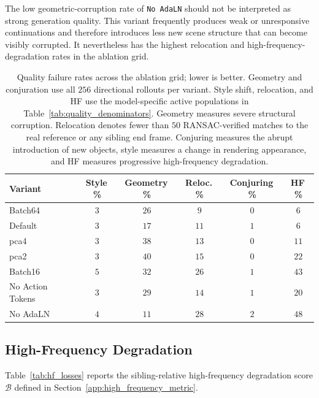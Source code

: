 The low geometric-corruption rate of \texttt{No AdaLN} should not be
interpreted as strong generation quality. This variant frequently produces
weak or unresponsive continuations and therefore introduces less new scene
structure that can become visibly corrupted. It nevertheless has the highest
relocation and high-frequency-degradation rates in the ablation grid.

\begin{table}[t]
\centering
{
\small
\setlength{\tabcolsep}{4pt}
\begin{tabular}{lccccc}
\toprule
Variant & Style\,\% & Geometry\,\% & Reloc.\,\% & Conjuring\,\% & HF\,\% \\
\midrule
Batch64          & $3$ & $26$ & $9$  & $0$   & $6$  \\
Default          & $3$ & $17$ & $11$ & $1$   & $6$  \\
pca4             & $3$ & $38$ & $13$ & $0$ & $11$ \\
pca2             & $3$ & $40$ & $15$ & $0$   & $22$ \\
Batch16          & $5$ & $32$ & $26$ & $1$ & $43$ \\
No Action Tokens & $3$ & $29$ & $14$ & $1$   & $20$ \\
No AdaLN         & $4$ & $11$ & $28$ & $2$ & $48$ \\
\bottomrule
\end{tabular}
}
\caption{
    Quality failure rates across the ablation grid; lower is better. Geometry
    and conjuration use all $256$ directional rollouts per variant. Style
    shift, relocation, and HF use the model-specific active populations in
    Table~\ref{tab:quality_denominators}. Geometry measures severe structural
    corruption. Relocation denotes fewer than $50$ RANSAC-verified matches to
    the real reference or any sibling end frame. Conjuring measures the abrupt
    introduction of new objects, style measures a change in rendering
    appearance, and HF measures progressive high-frequency degradation.
}
\label{tab:quality_ablation}
\end{table}

\subsection{High-Frequency Degradation}
\label{app:high_frequency_results}

Table~\ref{tab:hf_losses} reports the sibling-relative high-frequency
degradation score $\mathcal B$ defined in
Section~\ref{app:high_frequency_metric}.

